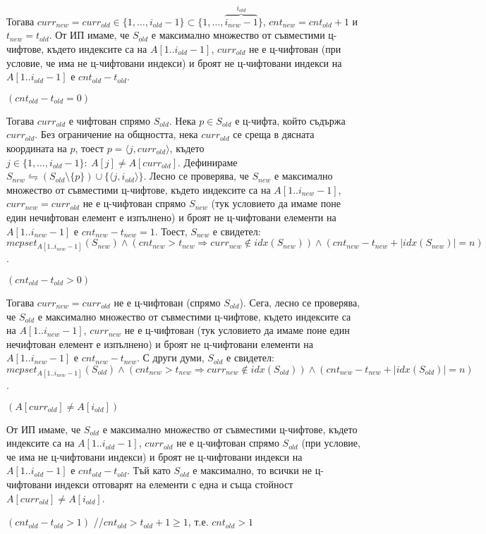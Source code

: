 \begin{solution}
\begin{maintenance}
\begin{mycase}
			\vspace{-0.35cm}
			Тогава $curr_{new}=curr_{old}\in\{1,\dots,i_{old}-1\}\subset\{1,\dots,\overbrace{i_{new}-1}^{i_{old}}\}$, $cnt_{new}=cnt_{old}+1$ и $t_{new}=t_{old}$. От ИП имаме, че $S_{old}$ е максимално множество от съвместими ц-чифтове, където индексите са на $A[1..i_{old}-1]$, $curr_{old}$ не е ц-чифтован (при условие, че има не ц-чифтовани индекси) и броят не ц-чифтовани индекси на $A[1..i_{old}-1]$ е $cnt_{old}-t_{old}$.
			\begin{mycase}
				\item $(cnt_{old}-t_{old}=0)$
				
				Тогава $curr_{old}$ е чифтован спрямо $S_{old}$. Нека $p\in S_{old}$ е ц-чифта, който съдържа $curr_{old}$. Без ограничение на общността, нека $curr_{old}$ се среща в дясната координата на $p$, тоест $p=\langle j,curr_{old}\rangle$, където $j\in\{1,\dots,i_{old}-1\}:\ A[j]\ne A[curr_{old}]$. Дефинираме $S_{new}\leftrightharpoons (S_{old}\setminus\{p\})\cup\{\langle j,i_{old}\rangle\}$. Лесно се проверява, че $S_{new}$ е максимално множество от съвместими ц-чифтове, където индексите са на $A[1..i_{new}-1]$, $curr_{new}=curr_{old}$ не е ц-чифтован спрямо $S_{new}$ (тук условието да имаме поне един нечифтован елемент е изпълнено) и броят не ц-чифтовани елементи на $A[1..i_{new}-1]$ е $cnt_{new}-t_{new}=1$. Тоест, $S_{new}$ е свидетел: $mcpset_{A[1..i_{new}-1]}(S_{new})\land(cnt_{new}>t_{new}\Rightarrow curr_{new}\notin idx(S_{new}))\land(cnt_{new}-t_{new}+|idx(S_{new})|=n)$.
				
				\item $(cnt_{old}-t_{old}>0)$
				
				Тогава $curr_{new}=curr_{old}$ не е ц-чифтован (спрямо $S_{old}$). Сега, лесно се проверява, че $S_{old}$ е максимално множество от съвместими ц-чифтове, където индексите са на $A[1..i_{new}-1]$, $curr_{new}$ не е ц-чифтован (тук условието да имаме поне един нечифтован елемент е изпълнено) и броят не ц-чифтовани елементи на $A[1..i_{new}-1]$ е $cnt_{new}-t_{new}$. С други думи, $S_{old}$ е свидетел: $mcpset_{A[1..i_{new}-1]}(S_{old})\land(cnt_{new}>t_{new}\Rightarrow curr_{new}\notin idx(S_{old}))\land(cnt_{new}-t_{new}+|idx(S_{old})|=n)$.
				
			\end{mycase}
		
			\item $(A[curr_{old}]\ne A[i_{old}])$
			
			От ИП имаме, че $S_{old}$ е максимално множество от съвместими ц-чифтове, където индексите са на $A[1..i_{old}-1]$, $curr_{old}$ не е ц-чифтован спрямо $S_{old}$ (при условие, че има не ц-чифтовани индекси) и броят не ц-чифтовани индекси на $A[1..i_{old}-1]$ е $cnt_{old}-t_{old}$. Тъй като $S_{old}$ е максимално, то всички не ц-чифтовани индекси отговарят на елементи с една и съща стойност $A[curr_{old}]\ne A[i_{old}]$.
			\begin{mycase}
				\item $(cnt_{old}-t_{old}>1)$ //$cnt_{old}>t_{old}+1\ge1$, т.е. $cnt_{old}>1$
				

\end{mycase}
\end{mycase}
\end{maintenance}
\end{solution}
